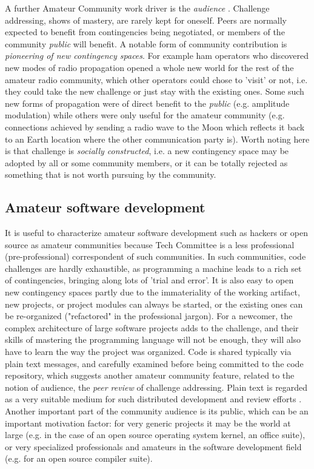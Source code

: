 \documentclass{acm_proc_article-sp}
\begin{document}
A further Amateur Community work driver is the \textit{audience} \cite{bogdan03}. Challenge addressing, shows of mastery, are rarely kept for oneself. %
Peers are normally expected to benefit from contingencies being negotiated, or members of the community \textit{public} will benefit. A notable form of community contribution is \textit{pioneering of new contingency spaces}.  For example ham operators who discovered new modes of radio propagation opened a whole new world for the rest of the amateur radio community, which other operators could chose to 'visit' or not, i.e. they could take the new challenge or just stay with the existing ones. Some such new forms of propagation were of direct benefit to the \textit{public}  (e.g. amplitude modulation) while others were only useful for the amateur community (e.g. connections achieved by sending a radio wave to the Moon which reflects it back to an Earth location where the other communication party is). Worth noting here is that challenge is \textit{socially constructed}, i.e. a new contingency space may be adopted by all or some community members, or it can be totally rejected as something that is not worth pursuing by the community.

\subsection{Amateur software development}\label{sec:amateur_devel}
It is useful to characterize amateur software development such as hackers \cite{levy94} or open source \cite{kollock99} as amateur communities 
because Tech Committee is a less professional (pre-professional) correspondent of such communities. 
In such communities, code challenges are hardly exhaustible, as programming a machine leads to a rich set of contingencies, bringing along lots of 'trial and error'. 
It is also easy to open new contingency spaces partly due to the immateriality of the working artifact, new projects, or project modules can always be started, or the existing ones can be re-organized ("refactored" in the professional jargon). For a newcomer, the complex architecture of large software projects adds to the challenge, and their skills of mastering the programming language will not be enough, they will also have to learn the way the project was organized.
Code is shared typically via plain text messages, and carefully examined before being committed to the code repository, which suggests another amateur community feature, related to the notion of audience, the \textit{peer review} of challenge addressing. 
Plain text is regarded as a very suitable medium for such distributed development and review efforts \cite{yamauchi00}. 
Another important part of the community audience is its public, which can be an important motivation factor: for very generic projects it may be the world at large (e.g. in the case of an open source operating system kernel, an office suite), or very specialized professionals and amateurs in the software development field (e.g. for an open source compiler suite).
\end{document}
